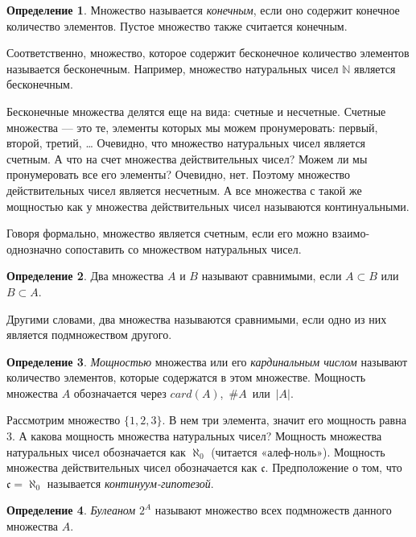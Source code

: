 \documentclass{article}
\theoremstyle{plain}
\theoremstyle{definition}
\newtheorem{definition}{Определение}[subsection]
\begin{document}
\begin{definition}
	Множество называется \textit{конечным}, если оно содержит конечное количество элементов. Пустое множество также считается конечным.
\end{definition}

Соответственно, множество, которое содержит бесконечное количество элементов называется бесконечным. Например, множество натуральных чисел \(\mathbb{N}\) является бесконечным.

Бесконечные множества делятся еще на вида: счетные и несчетные. Счетные множества — это те, элементы которых мы можем пронумеровать: первый, второй, третий, … Очевидно, что множество натуральных чисел является счетным. А что на счет множества действительных чисел? Можем ли мы пронумеровать все его элементы? Очевидно, нет. Поэтому множество действительных чисел является несчетным. А все множества с такой же мощностью как у множества действительных чисел называются континуальными.

Говоря формально, множество является счетным, если его можно взаимо-однозначно сопоставить со множеством натуральных чисел.

\begin{definition}
	Два множества \(A\) и \(B\) называют сравнимыми, если \(A \subset B\) или \(B \subset A\).
\end{definition}

Другими словами, два множества называются сравнимыми, если одно из них является подмножеством другого.

\begin{definition}
	\textit{Мощностью} множества или его \textit{кардинальным числом} называют количество элементов, которые содержатся в этом множестве. Мощность множества \(A\) обозначается через \(card(A)\),~\(\#A\)~или~\(|A|\).
\end{definition}

Рассмотрим множество \(\{1, 2, 3\}\). В нем три элемента, значит его мощность равна \(3\). А какова мощность множества натуральных чисел? Мощность множества натуральных чисел обозначается как \(\aleph_0\) (читается «алеф-ноль»). Мощность множества действительных чисел обозначается как \(\mathfrak{c}\). Предположение о том, что \(\mathfrak{c} = \aleph_0\) называется \textit{континуум-гипотезой}.

\begin{definition}
	\textit{Булеаном} \(2^A\) называют множество всех подмножеств данного множества \(A\).
\end{definition}
\end{document}
